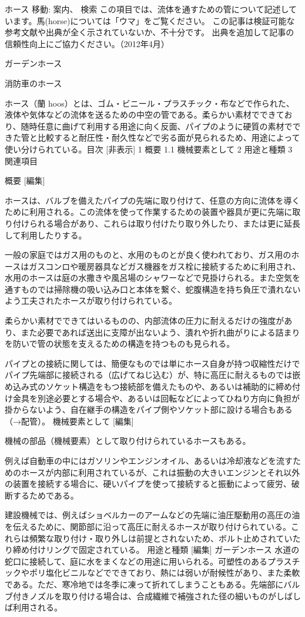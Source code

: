 ホース
移動: 案内、 検索 	この項目では、流体を通すための管について記述しています。馬(horse)については「ウマ」をご覧ください。
	この記事は検証可能な参考文献や出典が全く示されていないか、不十分です。
出典を追加して記事の信頼性向上にご協力ください。（2012年4月）

 
ガーデンホース
 
消防車のホース

ホース（蘭 hoos）とは、ゴム・ビニール・プラスチック・布などで作られた、液体や気体などの流体を送るための中空の管である。柔らかい素材でできており、随時任意に曲げて利用する用途に向く反面、パイプのように硬質の素材でできた管と比較すると耐圧性・耐久性などで劣る面が見られるため、用途によって使い分けられている。目次  [非表示] 
1 概要 
1.1 機械要素として
2 用途と種類
3 関連項目

概要 [編集]

ホースは、バルブを備えたパイプの先端に取り付けて、任意の方向に流体を導くために利用される。この流体を使って作業するための装置や器具が更に先端に取り付けられる場合があり、これらは取り付けたり取り外したり、または更に延長して利用したりする。

一般の家庭ではガス用のものと、水用のものとが良く使われており、ガス用のホースはガスコンロや暖房器具などガス機器をガス栓に接続するために利用され、水用のホースは庭の水撒きや風呂場のシャワーなどで見掛けられる。また空気を通すものでは掃除機の吸い込み口と本体を繋ぐ、蛇腹構造を持ち負圧で潰れないよう工夫されたホースが取り付けられている。

柔らかい素材でできてはいるものの、内部流体の圧力に耐えるだけの強度があり、また必要であれば送出に支障が出ないよう、潰れや折れ曲がりによる詰まりを防いで管の状態を支えるための構造を持つものも見られる。

パイプとの接続に関しては、簡便なものでは単にホース自身が持つ収縮性だけでパイプ先端部に接続される（広げてねじ込む）が、特に高圧に耐えるものでは嵌め込み式のソケット構造をもつ接続部を備えたものや、あるいは補助的に締め付け金具を別途必要とする場合や、あるいは回転などによってひねり方向に負担が掛からないよう、自在継手の構造をパイプ側やソケット部に設ける場合もある（→配管）。
機械要素として [編集]

機械の部品（機械要素）として取り付けられているホースもある。

例えば自動車の中にはガソリンやエンジンオイル、あるいは冷却液などを流すためのホースが内部に利用されているが、これは振動の大きいエンジンとそれ以外の装置を接続する場合に、硬いパイプを使って接続すると振動によって疲労、破断するためである。

建設機械では、例えばショベルカーのアームなどの先端に油圧駆動用の高圧の油を伝えるために、関節部に沿って高圧に耐えるホースが取り付けられている。これらは頻繁な取り付け・取り外しは前提とされないため、ボルト止めされていたり締め付けリングで固定されている。
用途と種類 [編集]
ガーデンホース 
水道の蛇口に接続して、庭に水をまくなどの用途に用いられる。可塑性のあるプラスチックやポリ塩化ビニルなどでできており、熱には弱いが耐候性があり、また柔軟である。ただ、寒冷地では冬季に凍って折れてしまうこともある。先端部にバルブ付きノズルを取り付ける場合は、合成繊維で補強された径の細いものがしばしば利用される。
 
